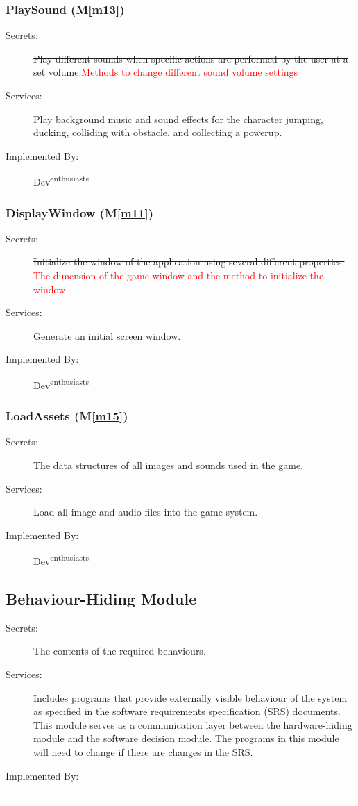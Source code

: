 \documentclass[12pt, titlepage]{article}
\newcommand{\mref}[1]{M\ref{#1}}
\begin{document}
\subsubsection{PlaySound (\mref{m13})}
\begin{description}
\item[Secrets:] \sout{Play different sounds when specific actions are performed by the user at a set volume.}\textcolor{red}{Methods to change different sound volume settings}
\item[Services:] Play background music and sound effects for the character jumping, ducking, colliding with obstacle, and collecting a powerup.
\item[Implemented By:] Dev\textsuperscript{enthusiasts}
\end{description}

\subsubsection{DisplayWindow (\mref{m11})}
\begin{description}
\item[Secrets:] \sout{Initialize the window of the application using several different properties.} \textcolor{red}{ The dimension of the game window and the method to initialize the window}
\item[Services:] Generate an initial screen window. 
\item[Implemented By:] Dev\textsuperscript{enthusiasts}
\end{description}

\subsubsection{LoadAssets (\mref{m15})}
\begin{description}
\item[Secrets:] The data structures of all images and sounds used in the game.
\item[Services:] Load all image and audio files into the game system.
\item[Implemented By:] Dev\textsuperscript{enthusiasts}
\end{description}

\subsection{Behaviour-Hiding Module}

\begin{description}
\item[Secrets:]The contents of the required behaviours.
\item[Services:]Includes programs that provide externally visible behaviour of
  the system as specified in the software requirements specification (SRS)
  documents. This module serves as a communication layer between the
  hardware-hiding module and the software decision module. The programs in this
  module will need to change if there are changes in the SRS.
\item[Implemented By:] --
\end{description}
\end{document}
